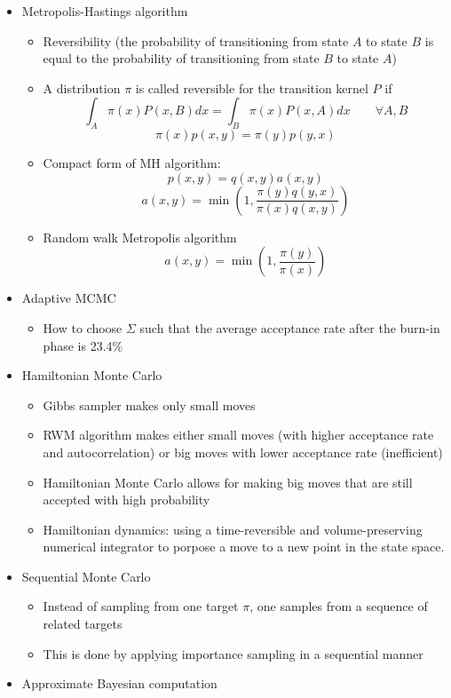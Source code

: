 \documentclass[a4paper]{article}
\begin{document}
\begin{itemize}
    \item Metropolis-Hastings algorithm
    \begin{itemize}
        \item Reversibility (the probability of transitioning from state $A$ to state $B$ is equal to the probability of transitioning from state $B$ to state $A$)
        \item A distribution $\pi$ is called reversible for the transition kernel $P$ if
        \[\int_A\pi(x)P(x, B)dx=\int_B\pi(x)P(x,A)dx \qquad\forall A, B \]
        \[\pi(x)p(x,y)=\pi(y)p(y,x) \]
        \item Compact form of MH algorithm:
        \[p(x,y)=q(x,y)a(x,y) \]
        \[a(x,y)=\min\left(1,\frac{\pi(y)q(y,x)}{\pi(x)q(x,y)} \right) \]
        \item Random walk Metropolis algorithm
        \[a(x,y)=\min\left(1,\frac{\pi(y)}{\pi(x)} \right) \]
    \end{itemize}
    \item Adaptive MCMC
    \begin{itemize}
        \item How to choose $\Sigma$ such that the average acceptance rate after the burn-in phase is 23.4\%
    \end{itemize}
    \item Hamiltonian Monte Carlo
    \begin{itemize}
        \item Gibbs sampler makes only small moves
        \item RWM algorithm makes either small moves (with higher acceptance rate and autocorrelation) or big moves with lower acceptance rate (inefficient)
        \item Hamiltonian Monte Carlo allows for making big moves that are still accepted with high probability
        \item Hamiltonian dynamics: using a time-reversible and volume-preserving numerical integrator to porpose a move to a new point in the state space.
    \end{itemize}
    \item Sequential Monte Carlo
    \begin{itemize}
        \item Instead of sampling from one target $\pi$, one samples from a sequence of related targets
        \item This is done by applying importance sampling in a sequential manner
    \end{itemize}
    \item Approximate Bayesian computation
\end{itemize}
\end{document}
